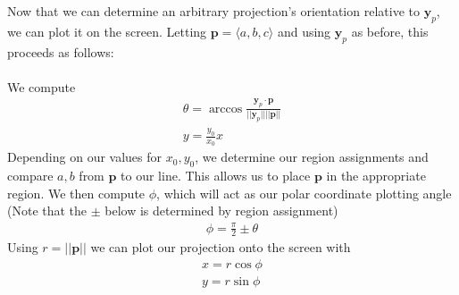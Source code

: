 \documentclass{article}
\begin{document}
Now that we can determine an arbitrary projection's orientation relative to $\textbf{y}_p$, we can plot it on the screen. Letting
$\textbf{p} = \langle a,b,c \rangle$ and using $\textbf{y}_p$ as before, this proceeds as follows:
\\\\
We compute
\begin{align*}
\theta = \arccos{\frac{\textbf{y}_p \cdot \textbf{p}}{||\textbf{y}_p|| ||\textbf{p}||}}\\
y = \frac{y_0}{x_0}x
\end{align*}
Depending on our values for $x_0,y_0$, we determine our region assignments and compare $a,b$ from $\textbf{p}$ to our line. This allows us to
place $\textbf{p}$ in the appropriate region. We then compute $\phi$, which will act as our polar coordinate plotting angle
(Note that the $\pm$ below is determined by region assignment)
\begin{align*}
\phi = \frac{\pi}{2} \pm \theta
\end{align*}
Using $r = ||\textbf{p}||$ we can plot our projection onto the screen with
\begin{align*}
x = r\cos \phi\\
y = r\sin \phi
\end{align*}
\end{document}
